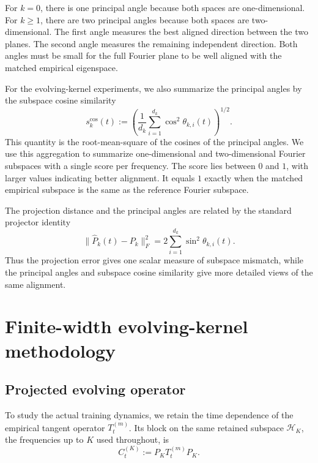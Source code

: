 For \(k=0\), there is one principal angle because both spaces are
one-dimensional. For \(k\ge 1\), there are two principal angles because both
spaces are two-dimensional. The first angle measures the best aligned direction
between the two planes. The second angle measures the remaining independent
direction. Both angles must be small for the full Fourier plane to be well
aligned with the matched empirical eigenspace.

For the evolving-kernel experiments, we also summarize the principal angles by
the subspace cosine similarity
\begin{equation}
	s_k^{\mathrm{cos}}(t)
	:=
	\left(
	\frac{1}{d_k}
	\sum_{i=1}^{d_k}\cos^2\theta_{k,i}(t)
	\right)^{1/2}.
	\label{eq:method-subspace-cosine-similarity}
\end{equation}
This quantity is the root-mean-square of the cosines of the principal angles.
We use this aggregation to summarize one-dimensional and two-dimensional Fourier
subspaces with a single score per frequency. The score lies between \(0\) and
\(1\), with larger values indicating better alignment. It equals \(1\) exactly
when the matched empirical subspace is the same as the reference Fourier
subspace.

The projection distance and the principal angles are related by the standard
projector identity \citep{bjorck1973numerical}
\begin{equation}
	\|\widehat P_k(t)-P_k\|_F^2
	=
	2\sum_{i=1}^{d_k}\sin^2\theta_{k,i}(t).
	\label{eq:method-projector-angle-identity}
\end{equation}
Thus the projection error gives one scalar measure of subspace mismatch, while
the principal angles and subspace cosine similarity give more detailed views of
the same alignment.

\section{Finite-width evolving-kernel methodology}
\label{sec:finite-width-evolving-kernel-methodology}
\subsection{Projected evolving operator}

To study the actual training dynamics, we retain the time dependence of the
empirical tangent operator \(T_t^{(m)}\). Its block on the same retained
subspace \(\mathcal H_K\), the frequencies up to \(K\) used throughout, is
\begin{equation}
	C_t^{(K)}:=P_KT_t^{(m)}P_K.
	\label{eq:method-evolving-block}
\end{equation}

